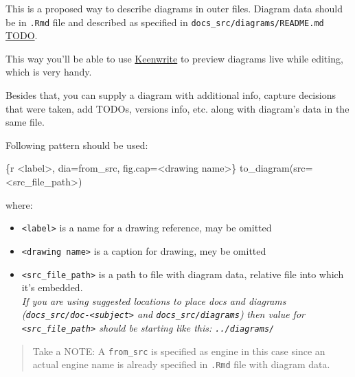 \documentclass[
  12pt,
  a4paper,
  12pt,
  oneside,
  openany]{book}
\newenvironment{Shaded}{\begin{snugshade}}{\end{snugshade}}
\newcommand{\DataTypeTok}[1]{\textcolor[rgb]{0.27,0.27,0.27}{#1}}
\newcommand{\StringTok}[1]{\textcolor[rgb]{0.5,0.5,0.5}{#1}}
\providecommand{\tightlist}{%
  \setlength{\itemsep}{0pt}\setlength{\parskip}{0pt}}
\begin{document}
This is a proposed way to describe diagrams in outer files. Diagram data should be in \texttt{.Rmd} file and described as specified in \texttt{docs\_src/diagrams/README.md} \url{TODO}.

This way you'll be able to use \href{https://github.com/DaveJarvis/keenwrite}{Keenwrite} to preview diagrams live while editing, which is very handy.

Besides that, you can supply a diagram with additional info, capture decisions that were taken, add TODOs, versions info, etc. along with diagram's data in the same file.

Following pattern should be used:

\begin{Shaded}
\begin{Highlighting}[]
\StringTok{\textasciigrave{}\textasciigrave{}\textasciigrave{}}\DataTypeTok{\{r \textless{}label\textgreater{}, dia=\textquotesingle{}from\_src\textquotesingle{}, fig.cap=\textquotesingle{}\textless{}drawing name\textgreater{}\textquotesingle{}\}}
\DataTypeTok{  to\_diagram(src=\textquotesingle{}\textless{}src\_file\_path\textgreater{}\textquotesingle{})}
\StringTok{\textasciigrave{}\textasciigrave{}\textasciigrave{}}
\end{Highlighting}
\end{Shaded}

where:

\begin{itemize}
\tightlist
\item
  \texttt{\textless{}label\textgreater{}} is a name for a drawing reference, may be omitted
\item
  \texttt{\textless{}drawing\ name\textgreater{}} is a caption for drawing, mey be omitted
\item
  \texttt{\textless{}src\_file\_path\textgreater{}} is a path to file with diagram data, relative file into which it's embedded.\\
  \emph{If you are using suggested locations to place docs and diagrams (\texttt{docs\_src/doc-\textless{}subject\textgreater{}} and \texttt{docs\_src/diagrams})} \emph{then value for \texttt{\textless{}src\_file\_path\textgreater{}} should be starting like this: \texttt{../diagrams/}}
\end{itemize}

\begin{quote}
Take a NOTE: A \texttt{from\_src} is specified as engine in this case since an actual engine name is already specified in \texttt{.Rmd} file with diagram data.
\end{quote}
\end{document}
